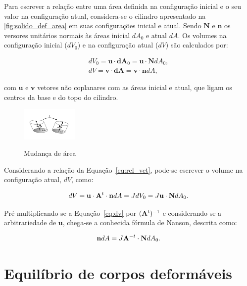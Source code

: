 Para escrever a relação entre uma área definida na configuração inicial e o seu valor na configuração atual, considera-se o cilindro apresentado na \autoref{fig:solido_def_area} em suas configurações inicial e atual. Sendo $\mathbf{N}$ e $\mathbf{n}$ os versores unitários normais às áreas inicial $dA_{0}$ e atual $dA$. Os volumes na configuração inicial ($dV_{0}$) e na configuração atual ($dV$) são calculados por:

\begin{align}
	dV_{0} = \mathbf{u} \cdot \mathbf{dA}_{0} = \mathbf{u} \cdot \mathbf{N} dA_0 ,\\
	dV = \mathbf{v} \cdot \mathbf{dA} = \mathbf{v} \cdot \mathbf{n} dA \label{eq:vol_func_area},
\end{align}

\noindent com $\mathbf{u}$ e $\mathbf{v}$ vetores não coplanares com as áreas inicial e atual, que ligam os centros da base e do topo do cilindro.

\begin{figure}[!htbp]
	\caption{Mudança de área}
	\centering
	\includegraphics[scale=6.0,trim=0cm 0.2cm 0cm 0cm, clip=true]{Imagens/Cap4/sol_def_area.pdf}	
	\label{fig:solido_def_area}
\end{figure}

Considerando a relação da Equação~\eqref{eq:rel_vet}, pode-se escrever o volume na configuração atual, $dV$, como:

\begin{align}
	dV = \mathbf{u} \cdot \mathbf{A}^{t} \cdot \mathbf{n} dA = J dV_0 = J \mathbf{u} \cdot \mathbf{N} dA_0. \label{eq:dv}
\end{align}

Pré-multiplicando-se a Equação~\eqref{eq:dv} por $(\mathbf{A}^{t})^{-1}$ e considerando-se a arbitrariedade de $\mathbf{u}$, chega-se a conhecida fórmula de Nanson, descrita como:

\begin{align}
	\mathbf{n}dA = J \mathbf{A}^{-t} \cdot \mathbf{N} dA_{0}. \label{eq:Nanson}
\end{align}


\section{Equilíbrio de corpos deformáveis} \label{capitulo:Cap3:EquilibrioCorposDeformaveis}

